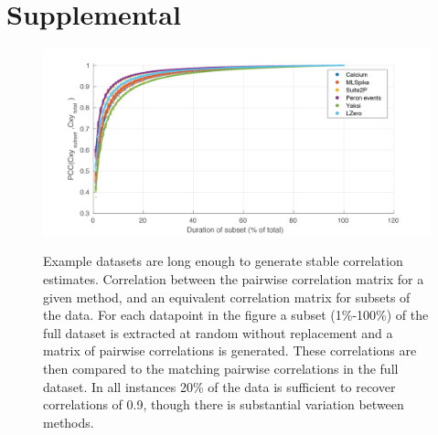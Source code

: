 \documentclass[a4paper,10pt,twocolumn]{article}
\begin{document}
\clearpage
\section{Supplemental}

\begin{figure}[h!]
{\includegraphics[trim={30 20 60 20},clip,width=\textwidth]{figs/cxy_subset_comparison3.png}}
{\caption{\label{fig:supp_cxy_stability}Example datasets are long enough to generate stable correlation estimates. Correlation between the pairwise correlation matrix for a given method, and an equivalent correlation matrix for subsets of the data. For each datapoint in the figure a subset (1\%-100\%) of the full dataset is extracted at random without replacement and a matrix of pairwise correlations is generated. These correlations are then compared to the matching pairwise correlations in the full dataset. In all instances 20\% of the data is sufficient to recover correlations of 0.9, though there is substantial variation between methods.}}%
\end{figure} %



\end{document}
